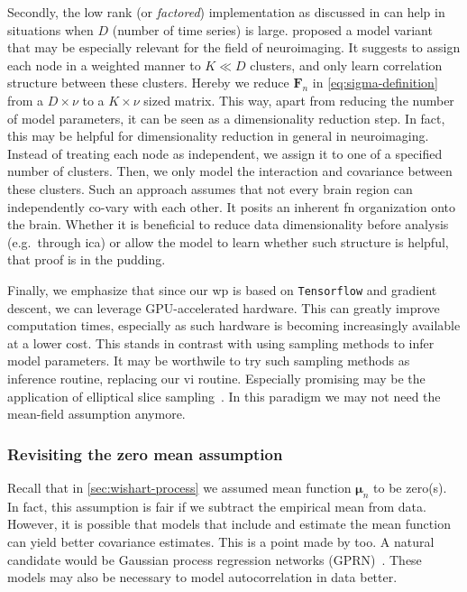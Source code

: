 Secondly, the low rank (or \emph{factored}) implementation as discussed in \textcite{Heaukulani2019} can help in situations when $D$ (number of time series) is large.
\textcite{Heaukulani2019} proposed a model variant~\parencite[in turn built upon work by][]{Fox2015} that may be especially relevant for the field of neuroimaging.
It suggests to assign each node in a weighted manner to $K \ll D$ clusters, and only learn correlation structure between these clusters.
Hereby we reduce $\mathbf{F}_n$ in \cref{eq:sigma-definition} from a $D \times \nu$ to a $K \times \nu$ sized matrix.
This way, apart from reducing the number of model parameters, it can be seen as a dimensionality reduction step.
%
In fact, this may be helpful for dimensionality reduction in general in neuroimaging.
Instead of treating each node as independent, we assign it to one of a specified number of clusters.
Then, we only model the interaction and covariance between these clusters.
Such an approach assumes that not every brain region can independently co-vary with each other.
It posits an inherent \gls{fn} organization onto the brain.
Whether it is beneficial to reduce data dimensionality before analysis (e.g.~through \gls{ica}) or allow the model to learn whether such structure is helpful, that proof is in the pudding.

Finally, we emphasize that since our \gls{wp} is based on \texttt{Tensorflow} and gradient descent, we can leverage GPU-accelerated hardware.
This can greatly improve computation times, especially as such hardware is becoming increasingly available at a lower cost.
This stands in contrast with using sampling methods to infer model parameters.
%
It may be worthwile to try such sampling methods as inference routine, replacing our \gls{vi} routine.
Especially promising may be the application of elliptical slice sampling~\parencite{Murray2010}.
In this paradigm we may not need the mean-field assumption anymore.

\subsubsection{Revisiting the zero mean assumption}

Recall that in \cref{sec:wishart-process} we assumed mean function $\mathbf{\mu}_n$ to be zero(s).
In fact, this assumption is fair if we subtract the empirical mean from data.
%
However, it is possible that models that include and estimate the mean function can yield better covariance estimates.
This is a point made by \textcite{Lan2017} too.
A natural candidate would be Gaussian process regression networks (GPRN)~\parencite{Wilson2012}.
These models may also be necessary to model autocorrelation in data better.

